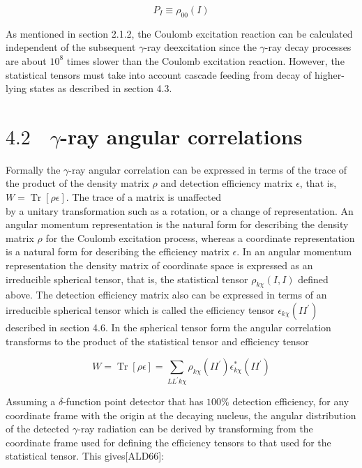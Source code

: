 \documentclass[10pt]{article}
\begin{document}
\begin{equation*}
P_{I} \equiv \rho_{00}(I) \tag{4.4}
\end{equation*}


As mentioned in section 2.1.2, the Coulomb excitation reaction can be calculated independent of the subsequent $\gamma$-ray deexcitation since the $\gamma$-ray decay processes are about $10^{8}$ times slower than the Coulomb excitation reaction. However, the statistical tensors must take into account cascade feeding from decay of higher-lying states as described in section 4.3.

\section*{$4.2 \quad \gamma$-ray angular correlations}
Formally the $\gamma$-ray angular correlation can be expressed in terms of the trace of the product of the density matrix $\rho$ and detection efficiency matrix $\epsilon$, that is, $W=\operatorname{Tr}[\rho \epsilon]$. The trace of a matrix is unaffected\\
by a unitary transformation such as a rotation, or a change of representation. An angular momentum representation is the natural form for describing the density matrix $\rho$ for the Coulomb excitation process, whereas a coordinate representation is a natural form for describing the efficiency matrix $\epsilon$. In an angular momentum representation the density matrix of coordinate space is expressed as an irreducible spherical tensor, that is, the statistical tensor $\rho_{k \chi}(I, I)$ defined above. The detection efficiency matrix also can be expressed in terms of an irreducible spherical tensor which is called the efficiency tensor $\epsilon_{k \chi}\left(I I^{\prime}\right)$ described in section 4.6. In the spherical tensor form the angular correlation transforms to the product of the statistical tensor and efficiency tensor


\begin{equation*}
W=\operatorname{Tr}[\rho \epsilon]=\sum_{L L^{\prime} k \chi} \rho_{k \chi}\left(I I^{\prime}\right) \epsilon_{k \chi}^{*}\left(I I^{\prime}\right) \tag{4.5}
\end{equation*}


Assuming a $\delta$-function point detector that has $100 \%$ detection efficiency, for any coordinate frame with the origin at the decaying nucleus, the angular distribution of the detected $\gamma$-ray radiation can be derived by transforming from the coordinate frame used for defining the efficiency tensors to that used for the statistical tensor. This gives[ALD66]:
\end{document}
